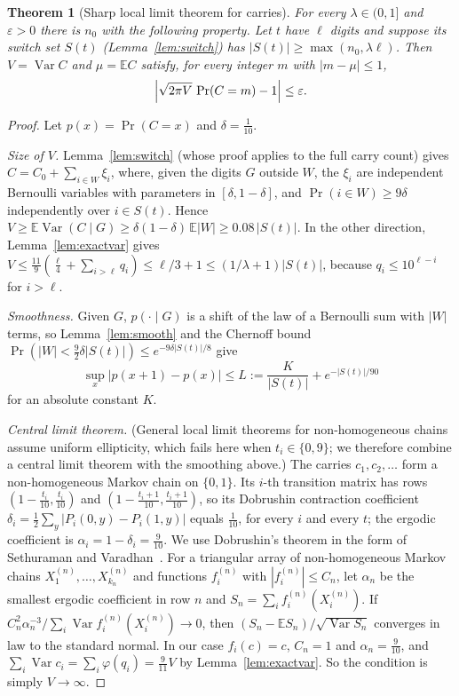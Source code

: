 \documentclass[11pt]{article}
\newtheorem{theorem}{Theorem}[section]
\theoremstyle{definition}
\theoremstyle{remark}
\begin{document}
\begin{theorem}[Sharp local limit theorem for carries]\label{thm:sharpllt}
For every $\lambda\in(0,1]$ and $\varepsilon>0$ there is $n_0$ with the
following property. Let $t$ have $\ell$ digits and suppose its switch set
$S(t)$ (Lemma~\ref{lem:switch}) has $|S(t)|\ge\max(n_0,\lambda\ell)$. Then
$V=\operatorname{Var}C$ and $\mu=\mathbb EC$ satisfy, for every integer $m$ with
$|m-\mu|\le1$,
\[
  \Bigl|\sqrt{2\pi V}\,\Pr(C=m)-1\Bigr|\le\varepsilon .
\]
\end{theorem}

\begin{proof}
Let $p(x)=\Pr(C=x)$ and $\delta=\frac1{10}$.

\emph{Size of $V$.} Lemma~\ref{lem:switch} (whose proof applies to the full
carry count) gives $C=C_0+\sum_{i\in W}\xi_i$, where, given the digits $G$
outside $W$, the $\xi_i$ are independent Bernoulli variables with
parameters in $[\delta,1-\delta]$, and $\Pr(i\in W)\ge9\delta$ independently
over $i\in S(t)$. Hence $V\ge\mathbb E\operatorname{Var}(C\mid G)\ge
\delta(1-\delta)\,\mathbb E|W|\ge0.08\,|S(t)|$. In the other direction,
Lemma~\ref{lem:exactvar} gives $V\le\frac{11}9(\frac\ell4+\sum_{i>\ell}q_i)
\le\ell/3+1\le(1/\lambda+1)|S(t)|$, because $q_i\le10^{\ell-i}$ for $i>\ell$.

\emph{Smoothness.} Given $G$, $p(\cdot\mid G)$ is a shift of the law of a
Bernoulli sum with $|W|$ terms, so Lemma~\ref{lem:smooth} and the Chernoff
bound $\Pr(|W|<\frac92\delta|S(t)|)\le e^{-9\delta|S(t)|/8}$ give
\[
  \sup_x|p(x+1)-p(x)|\le L:=\frac{K}{|S(t)|}+e^{-|S(t)|/90}
\]
for an absolute constant $K$.

\emph{Central limit theorem.} (General local limit theorems for
non-homogeneous chains~\cite{DolgopyatSarig} assume uniform ellipticity,
which fails here when $t_i\in\{0,9\}$; we therefore combine a central limit
theorem with the smoothing above.) The carries $c_1,c_2,\dots$ form a
non-homogeneous Markov chain on $\{0,1\}$. Its $i$-th transition matrix has
rows $(1-\frac{t_i}{10},\frac{t_i}{10})$ and
$(1-\frac{t_i+1}{10},\frac{t_i+1}{10})$, so its Dobrushin contraction
coefficient $\delta_i=\frac12\sum_y|P_i(0,y)-P_i(1,y)|$ equals $\frac1{10}$, for
every $i$ and every $t$; the ergodic coefficient is $\alpha_i=1-\delta_i=\frac9{10}$.
We use Dobrushin's theorem in the form of Sethuraman and
Varadhan~\cite[Thm.~1.1]{SethuramanVaradhan}. For a triangular array of
non-homogeneous Markov chains $X^{(n)}_1,\dots,X^{(n)}_{k_n}$ and functions
$f^{(n)}_i$ with $|f^{(n)}_i|\le C_n$, let $\alpha_n$ be the smallest ergodic
coefficient in row $n$ and $S_n=\sum_if^{(n)}_i(X^{(n)}_i)$. If
$C_n^2\alpha_n^{-3}/\sum_i\operatorname{Var}f^{(n)}_i(X^{(n)}_i)\to0$, then
$(S_n-\mathbb ES_n)/\sqrt{\operatorname{Var}S_n}$ converges in law to the
standard normal. In our case $f_i(c)=c$, $C_n=1$ and $\alpha_n=\frac9{10}$, and
$\sum_i\operatorname{Var}c_i=\sum_i\varphi(q_i)=\frac9{11}V$ by
Lemma~\ref{lem:exactvar}. So the condition is simply $V\to\infty$.


\end{proof}
\end{document}
